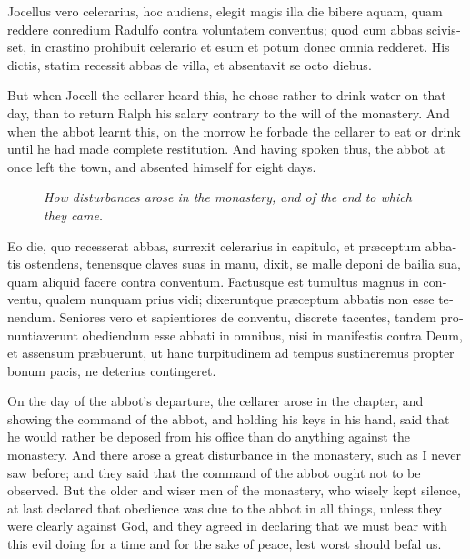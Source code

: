 \documentclass[10pt]{book}
\newcommand{\blockhead}[4][]{
\begin{figure}
\centering
\vspace{#4}
\parbox{2.75cm}{\begin{center}\footnotesize \color{BrickRed} \emph{#2}\\ #1 \end{center}}
\end{figure}
}
\begin{document}
\begin{paracol}{2}
\switchcolumn*

\begin{otherlanguage}{latin}
Jocellus vero celerarius, hoc audiens, elegit magis illa die bibere aquam, quam reddere conredium Radulfo contra voluntatem conventus; quod cum abbas scivisset, in crastino prohibuit celerario et esum et potum donec omnia redderet. His dictis, statim recessit abbas de villa, et absentavit se octo diebus.
\end{otherlanguage}

\switchcolumn

But when Jocell the cellarer heard this, he chose rather to drink water on that day, than to return Ralph his salary contrary to the will of the monastery. And when the abbot learnt this, on the morrow he forbade the cellarer to eat or drink until he had made complete restitution. And having spoken thus, the abbot at once left the town, and absented himself for eight days.

\switchcolumn*

\begin{otherlanguage}{latin}
\blockhead{How disturbances arose in the monastery, and of the end to which they came.}{4}{-.45cm}
Eo die, quo recesserat abbas, surrexit celerarius in capitulo, et pr\ae{}ceptum abbatis ostendens, tenensque claves suas in manu, dixit, se malle deponi de bailia sua, quam aliquid facere contra conventum. Factusque est tumultus magnus in conventu, qualem nunquam prius vidi; dixeruntque pr\ae{}ceptum abbatis non esse tenendum. Seniores vero et sapientiores de conventu, discrete tacentes, tandem pronuntiaverunt obediendum esse abbati in omnibus, nisi in manifestis contra Deum, et assensum pr\ae{}buerunt, ut hanc turpitudinem ad tempus sustineremus propter bonum pacis, ne deterius contingeret. 

\end{otherlanguage}

\switchcolumn

On the day of the abbot's departure, the cellarer arose in the chapter, and showing the command of the abbot, and holding his keys in his hand, said that he would rather be deposed from his office than do anything against the monastery. And there arose a great disturbance in the monastery, such as I never saw before; and they said that the command of the abbot ought not to be observed. But the older and wiser men of the monastery, who wisely kept silence, at last declared that obedience was due to the abbot in all things, unless they were clearly against God, and they agreed in declaring that we must bear with this evil doing for a time and for the sake of peace, lest worst should befal us.


\end{paracol}
\end{document}
